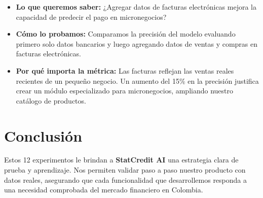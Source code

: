 \documentclass[11pt,a4paper]{article}
\begin{document}
\begin{tcolorbox}[colback=lightgray,colframe=secondary,title=\textbf{Experimento 6.2: Inclusión de datos de facturación electrónica (DIAN)}]
\begin{itemize}[leftmargin=*]
    \item \textbf{Lo que queremos saber:} ¿Agregar datos de facturas electrónicas mejora la capacidad de predecir el pago en micronegocios?
    \item \textbf{Cómo lo probamos:} Comparamos la precisión del modelo evaluando primero solo datos bancarios y luego agregando datos de ventas y compras en facturas electrónicas.
    \item \textbf{Por qué importa la métrica:} Las facturas reflejan las ventas reales recientes de un pequeño negocio. Un aumento del 15\% en la precisión justifica crear un módulo especializado para micronegocios, ampliando nuestro catálogo de productos.
\end{itemize}
\end{tcolorbox}

\section{Conclusión}
Estos 12 experimentos le brindan a \textbf{StatCredit AI} una estrategia clara de prueba y aprendizaje. Nos permiten validar paso a paso nuestro producto con datos reales, asegurando que cada funcionalidad que desarrollemos responda a una necesidad comprobada del mercado financiero en Colombia.
\end{document}
